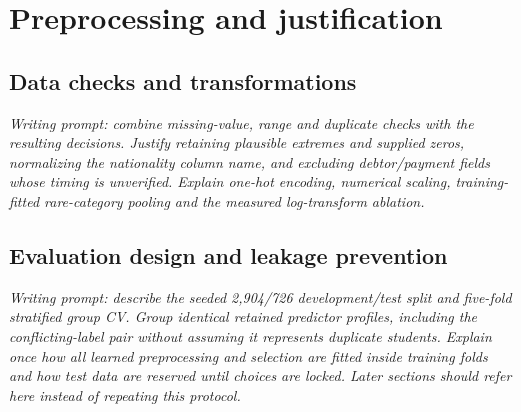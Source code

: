 \section{Preprocessing and justification}
\label{sec:preprocessing}

\subsection{Data checks and transformations}
\emph{Writing prompt: combine missing-value, range and duplicate checks with the
resulting decisions. Justify retaining plausible extremes and supplied zeros,
normalizing the nationality column name, and excluding debtor/payment fields
whose timing is unverified. Explain one-hot encoding, numerical scaling,
training-fitted rare-category pooling and the measured log-transform ablation.}

\subsection{Evaluation design and leakage prevention}
\emph{Writing prompt: describe the seeded 2,904/726 development/test split and
five-fold stratified group CV. Group identical retained predictor profiles,
including the conflicting-label pair without assuming it represents duplicate
students. Explain once how all learned preprocessing and selection are fitted
inside training folds and how test data are reserved until choices are locked.
Later sections should refer here instead of repeating this protocol.}


